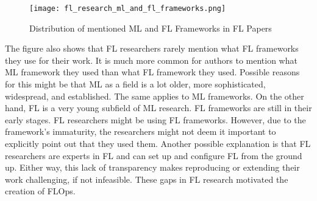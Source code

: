 \begin{figure}[h]
    \begin{adjustwidth}{-0.1\paperwidth}{-0.1\paperwidth}
        \centering
        \texttt{[image: fl\_research\_ml\_and\_fl\_frameworks.png]}
        \caption{Distribution of mentioned ML and FL Frameworks in FL Papers}
        \label{fig:fl_research_ml_and_fl_frameworks}
    \end{adjustwidth}
\end{figure}
The figure also shows that FL researchers rarely mention what FL frameworks they use for their work.
It is much more common for authors to mention what ML framework they used than what FL framework they used.
Possible reasons for this might be that ML as a field is a lot older, more sophisticated, widespread, and established.
The same applies to ML frameworks.
On the other hand, FL is a very young subfield of ML research.
FL frameworks are still in their early stages.
FL researchers might be using FL frameworks.
However, due to the framework's immaturity, the researchers might not deem it important to explicitly point out that they used them.
Another possible explanation is that FL researchers are experts in FL and can set up and configure FL from the ground up.
Either way, this lack of transparency makes reproducing or extending their work challenging, if not infeasible.
These gaps in FL research motivated the creation of FLOps.